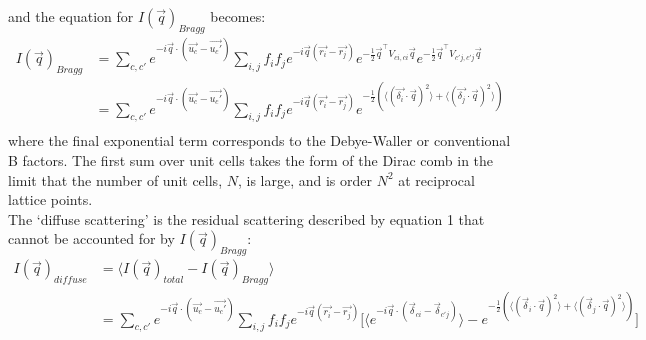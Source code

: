 \documentclass{article}
\begin{document}
and the equation for $I(\vec{q})_{Bragg}$ becomes:
\begin{equation}
\begin{aligned}
I(\vec{q})_{Bragg} & = \sum\limits_{c,c'} e^{-i \vec{q} \cdot (\vec{u_c} - \vec{u_c'})} \sum\limits_{i,j} f_i f_j e^{-i \vec{q} (\vec{r_i} - \vec{r_j})} e^{-\frac{1}{2} \vec{q}^\intercal V_{ci,ci} \vec{q}} e^{-\frac{1}{2} \vec{q}^\intercal V_{c'j,c'j} \vec{q}} \\
& = \sum\limits_{c,c'} e^{-i \vec{q} \cdot (\vec{u_c} - \vec{u_c'})} \sum\limits_{i,j} f_i f_j e^{-i \vec{q} (\vec{r_i} - \vec{r_j})} e^{-\frac{1}{2} (\langle (\vec{\delta_i} \cdot \vec{q})^2 \rangle + \langle (\vec{\delta_j} \cdot \vec{q})^2 \rangle) } \\
\end{aligned}
\end{equation}
where the final exponential term corresponds to the Debye-Waller or conventional B factors. The first sum over unit cells takes the form of the Dirac comb in the limit that the number of unit cells, $N$, is large, and is order $N^2$ at reciprocal lattice points. 
\newline
{}
\\
The `diffuse scattering' is the residual scattering described by equation 1 that cannot be accounted for by $I(\vec{q})_{Bragg}$:
\begin{equation}
\begin{aligned}
I(\vec{q})_{diffuse} & = \langle I(\vec{q})_{total} - I(\vec{q})_{Bragg} \rangle \\
& = \sum\limits_{c,c'} e^{-i \vec{q} \cdot (\vec{u_c} - \vec{u_c'})} \sum\limits_{i,j} f_i f_j e^{-i \vec{q} (\vec{r_i} - \vec{r_j})} \lbrack \langle e^{ -i \vec{q} \cdot (\vec{\delta}_{ci} - \vec{\delta}_{c'j} )} \rangle -  e^{-\frac{1}{2} (\langle (\vec{\delta}_i \cdot \vec{q})^2 \rangle + \langle (\vec{\delta}_j \cdot \vec{q})^2 \rangle) } \rbrack \\
\end{aligned}
\end{equation}
\end{document}
